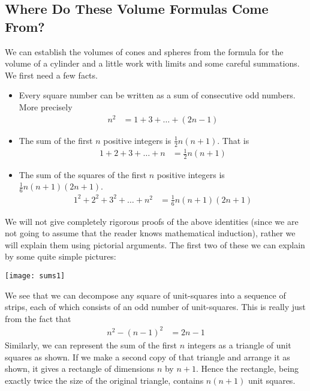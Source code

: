 \subsection{Where Do These Volume Formulas Come From?}\label{apendix volume}
We can establish the volumes of cones and spheres from the formula for the volume of a
cylinder and a little work with limits and some careful summations. We first need a few
facts.
\begin{itemize}
 \item Every square number can be written as a sum of consecutive odd numbers. More
precisely
  \begin{align*}
  n^2 &= 1 + 3 + \dots + (2n-1)
\end{align*}
 \item The sum of the first $n$ positive integers is $\frac{1}{2} n(n+1)$. That is
\begin{align*}
  1 + 2 +3 +\dots +n &= \frac{1}{2}n(n+1)
\end{align*}
 \item The sum of the squares of the first $n$ positive integers is $\frac{1}{6}
n(n+1)(2n+1)$.
\begin{align*}
  1^2 + 2^2 +3^2 +\dots + n^2 &= \frac{1}{6}n(n+1)(2n+1)
\end{align*}
\end{itemize}
We will not give completely rigorous proofs of the above identities (since we are not
going to assume that the reader knows mathematical induction), rather we will explain
them using pictorial arguments. The first two of these we can explain by some quite simple
pictures:
\begin{center}
 \texttt{[image: sums1]}
\end{center}
We see that we can decompose any square of unit-squares into a sequence of strips, each
of which consists of an odd number of unit-squares. This is really just from the fact that
\begin{align*}
  n^2 - (n-1)^2 &= 2n-1
\end{align*}
Similarly, we can represent the sum of the first $n$ integers as a triangle of unit
squares as shown. If we make a second copy of that triangle and arrange it as shown, it
gives a rectangle of dimensions $n$ by $n+1$. Hence the rectangle, being exactly twice the
size of the original triangle, contains $n(n+1)$ unit squares.

